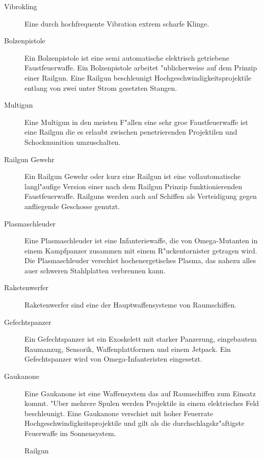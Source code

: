 \begin{description}
\item [Vibrokling] Eine durch hochfrequente Vibration extrem scharfe Klinge.
\item [Bolzenpistole] Ein Bolzenpistole ist eine semi automatische elektrisch getriebene Faustfeuerwaffe. Ein Bolzenpistole arbeitet "ublicherweise auf  
      dem Prinzip einer Railgun. Eine Railgun beschleunigt Hochgeschwindigkeitsprojektile entlang von zwei unter Strom gesetzten Stangen.
\item [Multigun] Eine Multigun in den meisten F"allen eine sehr gro\3e Faustfeuerwaffe ist eine Railgun die es erlaubt zwischen     
      penetrierenden Projektilen und Schockmunition umzuschalten.
\item [Railgun Gewehr] Ein Railgun Gewehr oder kurz eine Railgun ist eine vollautomatische langl"aufige Version einer nach 
      dem Railgun Prinzip funktionierenden Faustfeuerwaffe. Railguns werden auch auf Schiffen als Verteidigung gegen anfliegende Geschosse genutzt.         
\item [Plasmaschleuder] Eine Plasmaschleuder ist eine Infanteriewaffe, die von Omega-Mutanten in einem Kampfpanzer zusammen mit
      einem R"uckentornister getragen wird. Die Plasmaschleuder verschie\3t hochenergetisches Plasma, das nahezu alles au\3er schweren Stahlplatten verbrennen kann.
\item [Raketenwerfer] Raketenwerfer sind eine der Hauptwaffensysteme von Raumschiffen.      
\item [Gefechtspanzer] Ein Gefechtspanzer ist ein Exoskelett mit starker Panzerung, eingebautem Raumanzug, Sensorik,
      Waffenplattformen und einem Jetpack. Ein Gefechtspanzer wird von Omega-Infanteristen eingesetzt.
\item [Gau\3kanone] Eine Gau\3kanone ist eine Waffensystem das auf Raumschiffen zum Einsatz kommt. "Uber mehrere Spulen
      werden Projektile in einem elektrisches Feld beschleunigt. Eine Gau\3kanone verschie\3t mit hoher Feuerrate Hochgeschwindigkeitsprojektile und gilt als die durchschlagskr"aftigste Feuerwaffe im Sonnensystem.         
\end{description}

\begin{figure}[htbp]
      \centering
      \newline{}Railgun
      \label{fig:rail-gun}
\end{figure}

